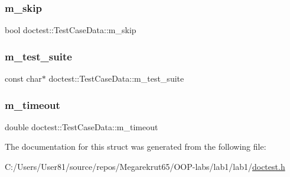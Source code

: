 \subsubsection{\texorpdfstring{m\+\_\+skip}{m\_skip}}
{\footnotesize\ttfamily bool doctest\+::\+Test\+Case\+Data\+::m\+\_\+skip}

\mbox{\label{structdoctest_1_1_test_case_data_ae264da66ff0e88a34c467d364dd18840}} 
\subsubsection{\texorpdfstring{m\+\_\+test\+\_\+suite}{m\_test\_suite}}
{\footnotesize\ttfamily const char$\ast$ doctest\+::\+Test\+Case\+Data\+::m\+\_\+test\+\_\+suite}

\mbox{\label{structdoctest_1_1_test_case_data_a8cab4a7998b486bafa81498f93dd4d91}} 
\subsubsection{\texorpdfstring{m\+\_\+timeout}{m\_timeout}}
{\footnotesize\ttfamily double doctest\+::\+Test\+Case\+Data\+::m\+\_\+timeout}



The documentation for this struct was generated from the following file\+:\begin{DoxyCompactItemize}
\item 
C\+:/\+Users/\+User81/source/repos/\+Megarekrut65/\+O\+O\+P-\/labs/lab1/lab1/\mbox{\hyperlink{doctest_8h}{doctest.\+h}}\end{DoxyCompactItemize}
